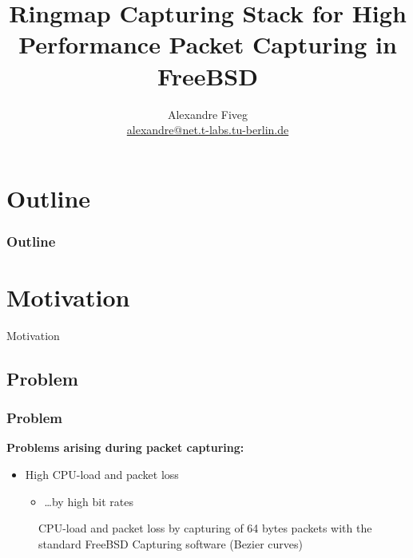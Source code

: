 \documentclass{beamer}
\title{Ringmap Capturing Stack for High Performance Packet Capturing in FreeBSD}
\author[Alexandre Fiveg]{ Alexandre Fiveg \\
\url{alexandre@net.t-labs.tu-berlin.de} }
\institute[TU Berlin/DT Labs]{Technische Universtit\"at Berlin \\ Deutsche Telekom Laboratories}
\begin{document}
\frame{\titlepage}

\section*{Outline}

\begin{frame}
\frametitle{Outline}
\tableofcontents
\end{frame}




\section{Motivation}

\begin{frame}
	\begin{center}
	\huge{Motivation}
	\end{center}
\end{frame}

\subsection*{Problem}
\begin{frame}
\frametitle{Problem}
\textbf{Problems arising during packet capturing:}
\begin{itemize}
	\item High CPU-load and packet loss
		\begin{itemize}
			\item \ldots by high bit rates  \newline
		\end{itemize}
\end{itemize}
\begin{figure}[H] 
	\caption{CPU-load and packet loss by capturing of  64 bytes packets with the standard FreeBSD Capturing software (Bezier curves)}
\end{figure}
\end{frame}
\end{document}
